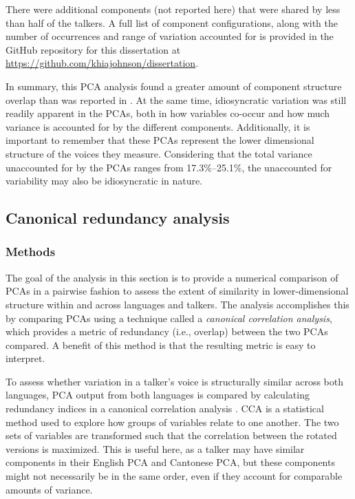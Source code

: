 There were additional components (not reported here) that were shared by less than half of the talkers. A full list of component configurations, along with the number of occurrences and range of variation accounted for is provided in the GitHub repository for this dissertation at \url{https://github.com/khiajohnson/dissertation}.

In summary, this PCA analysis found a greater amount of component structure overlap than was reported in \citet{lee_2019_acoustic}. At the same time, idiosyncratic variation was still readily apparent in the PCAs, both in how variables co-occur and how much variance is accounted for by the different components. Additionally, it is important to remember that these PCAs represent the lower dimensional structure of the voices they measure. Considering that the total variance unaccounted for by the PCAs ranges from 17.3\%--25.1\%, the unaccounted for variability may also be idiosyncratic in nature. 

\subsection{Canonical redundancy analysis}\label{ch3:sec:cca}

\subsubsection{Methods}

The goal of the analysis in this section is to provide a numerical comparison of PCAs in a pairwise fashion to assess the extent of similarity in lower-dimensional structure within and across languages and talkers. The analysis accomplishes this by comparing PCAs using a technique called a \textit{canonical correlation analysis}, which provides a metric of redundancy (i.e., overlap) between the two PCAs compared. A benefit of this method is that the resulting metric is easy to interpret. 

To assess whether variation in a talker's voice is structurally similar across both languages, PCA output from both languages is compared by calculating redundancy indices in a canonical correlation analysis \citep[CCA:][]{stewart_1968_canonical, jolliffe_2002_pca}. CCA is a statistical method used to explore how groups of variables relate to one another. The two sets of variables are transformed such that the correlation between the rotated versions is maximized. This is useful here, as a talker may have similar components in their English PCA and Cantonese PCA, but these components might not necessarily be in the same order, even if they account for comparable amounts of variance.

